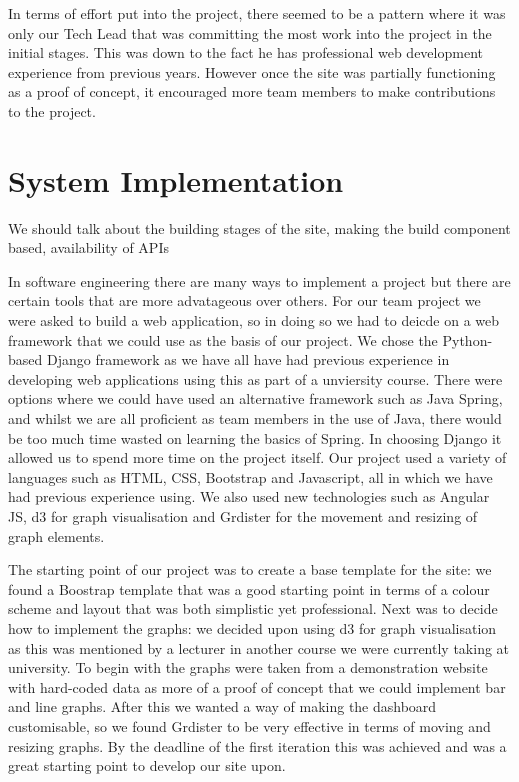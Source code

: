 \documentclass{l3proj}
\begin{document}
In terms of effort put into the project, there seemed to be a pattern where it was only our Tech Lead that was committing the most
work into the project in the initial stages. This was down to the fact he has professional web development experience from previous
years. However once the site was partially functioning as a proof of concept, it encouraged more team members to make contributions
to the project.



\section{System Implementation}
\label{design}

We should talk about the building stages of the site, making the build component based, availability of APIs

In software engineering there are many ways to implement a project but there are certain tools that are more advatageous over
others. For our team project we were asked to build a web application, so in doing so we had to deicde on a web framework that
we could use as the basis of our project. We chose the Python-based Django framework as we have all have had previous experience
in developing web applications using this as part of a unviersity course. There were options where we could have used an alternative
framework such as Java Spring, and whilst we are all proficient as team members in the use of Java, there would be too much time
wasted on learning the basics of Spring. In choosing Django it allowed us to spend more time on the project itself. Our project
used a variety of languages such as HTML, CSS, Bootstrap and Javascript, all in which we have had previous experience using.
We also used new technologies such as Angular JS, d3 for graph visualisation and Grdister for the movement and resizing of graph
elements.

The starting point of our project was to create a base template for the site: we found a Boostrap template that was a good starting
point in terms of a colour scheme and layout that was both simplistic yet professional. Next was to decide how to implement the
graphs: we decided upon using d3 for graph visualisation as this was mentioned by a lecturer in another course we were currently
taking at university. To begin with the graphs were taken from a demonstration website with hard-coded data as more of a proof
of concept that we could implement bar and line graphs. After this we wanted a way of making the dashboard customisable, so we
found Grdister to be very effective in terms of moving and resizing graphs. By the deadline of the first iteration this was
achieved and was a great starting point to develop our site upon.
\end{document}
